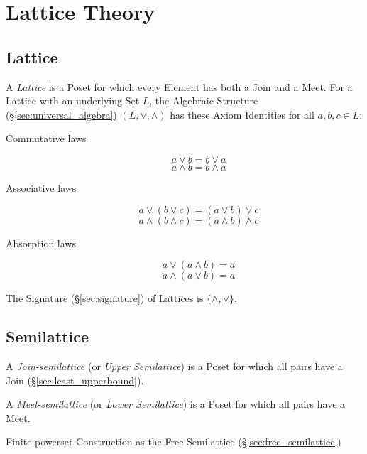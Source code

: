 \section{Lattice Theory}\label{sec:lattice_theory}

\subsection{Lattice}\label{sec:lattice}

A \emph{Lattice} is a Poset for which every Element has both a Join
and a Meet. For a Lattice with an underlying Set $L$, the Algebraic
Structure (\S\ref{sec:universal_algebra}) $(L, \vee, \wedge)$ has
these Axiom Identities for all $a,b,c \in L$:
\begin{description}
\item[Commutative laws]
\[
    a \vee b = b \vee a
\] \[
    a \wedge b = b \wedge a
\]
\item[Associative laws]
\[
    a \vee (b \vee c) = (a \vee b) \vee c
\] \[
    a \wedge (b \wedge c) = (a \wedge b) \wedge c
\]
\item[Absorption laws]
\[
    a \vee (a \wedge b) = a
\] \[
    a \wedge (a \vee b) = a
\]
\end{description}
The Signature (\S\ref{sec:signature}) of Lattices is
$\{\wedge, \vee\}$.



\subsection{Semilattice}\label{sec:semilattice}

A \emph{Join-semilattice} (or \emph{Upper Semilattice}) is a Poset for
which all pairs have a Join (\S\ref{sec:least_upperbound}).

A \emph{Meet-semilattice} (or \emph{Lower Semilattice}) is a Poset for
which all pairs have a Meet.

Finite-powerset Construction as the Free Semilattice
(\S\ref{sec:free_semilattice})



